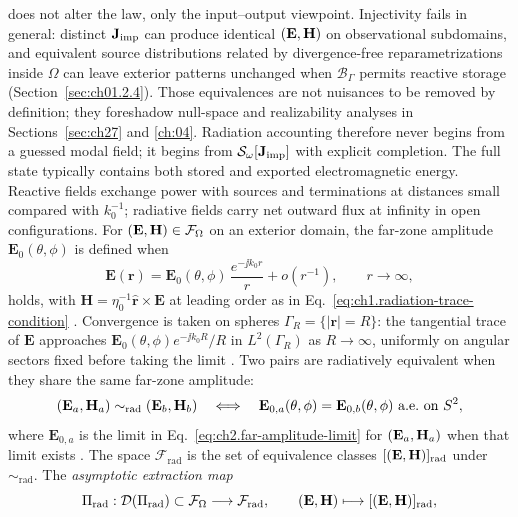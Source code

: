 does not alter the law, only the input--output viewpoint.
Injectivity fails in general: distinct \(\mathbf{J}_{\mathrm{imp}}\) can produce identical \((\mathbf{E},\mathbf{H})\)
on observational subdomains, and equivalent source distributions related by
divergence-free reparametrizations inside \(\Omega\) can leave exterior patterns
unchanged when \(\mathcal{B}_\Gamma\) permits reactive storage
(Section~\ref{sec:ch01.2.4}). Those equivalences are not nuisances to be removed
by definition; they foreshadow null-space and realizability analyses in
Sections~\ref{sec:ch27} and \ref{ch:04}. Radiation accounting therefore
never begins from a guessed modal field; it begins from \(\mathcal{S}_\omega[\mathbf{J}_{\mathrm{imp}}]\)
with explicit completion.
The full state typically contains both stored and exported electromagnetic energy.
Reactive fields exchange power with sources and terminations at distances small
compared with \(k_0^{-1}\); radiative fields carry net outward flux at infinity
in open configurations. For $(\mathbf{E},\mathbf{H})\in\mathcal{F}_\Omega$ on an exterior domain, the far-zone amplitude $\mathbf{E}_0(\theta,\phi)$ is defined when
\begin{equation}
\label{eq:ch2.far-amplitude-limit}
\mathbf{E}(\mathbf{r})
=
\mathbf{E}_{0}(\theta,\phi)\,\frac{e^{-\jj k_0 r}}{r}
+o(r^{-1}),
\qquad r\to\infty,
\end{equation}
holds, with $\mathbf{H}=\eta_0^{-1}\hat{\mathbf{r}}\times\mathbf{E}$ at leading order as in Eq.~\eqref{eq:ch1.radiation-trace-condition} \cite{stratton1941,sommerfeld1949}. Convergence is taken on spheres $\Gamma_R=\{|\mathbf{r}|=R\}$: the tangential trace of $\mathbf{E}$ approaches $\mathbf{E}_0(\theta,\phi)e^{-\jj k_0 R}/R$ in $L^{2}(\Gamma_R)$ as $R\to\infty$, uniformly on angular sectors fixed before taking the limit \cite{jackson1999}. Two pairs are radiatively equivalent when they share the same far-zone amplitude:
\begin{equation}
\label{eq:ch2.radiative-equivalence}
(\mathbf{E}_a,\mathbf{H}_a)\sim_{\mathrm{rad}}(\mathbf{E}_b,\mathbf{H}_b)
\quad\Longleftrightarrow\quad
\mathbf{E}_{0,a}(\theta,\phi)=\mathbf{E}_{0,b}(\theta,\phi)
\ \text{a.e.\ on }S^{2},
\end{equation}
where $\mathbf{E}_{0,a}$ is the limit in Eq.~\eqref{eq:ch2.far-amplitude-limit} for $(\mathbf{E}_a,\mathbf{H}_a)$ when that limit exists \cite{stratton1941}. The space $\mathcal{F}_{\mathrm{rad}}$ is the set of equivalence classes $[(\mathbf{E},\mathbf{H})]_{\mathrm{rad}}$ under $\sim_{\mathrm{rad}}$. The \emph{asymptotic extraction map}
\begin{equation}
\label{eq:ch2.Pirad-map-def}
\Pi_{\mathrm{rad}}:\mathcal{D}(\Pi_{\mathrm{rad}})\subset\mathcal{F}_\Omega
\longrightarrow\mathcal{F}_{\mathrm{rad}},
\qquad
(\mathbf{E},\mathbf{H})\longmapsto [(\mathbf{E},\mathbf{H})]_{\mathrm{rad}},
\end{equation}
